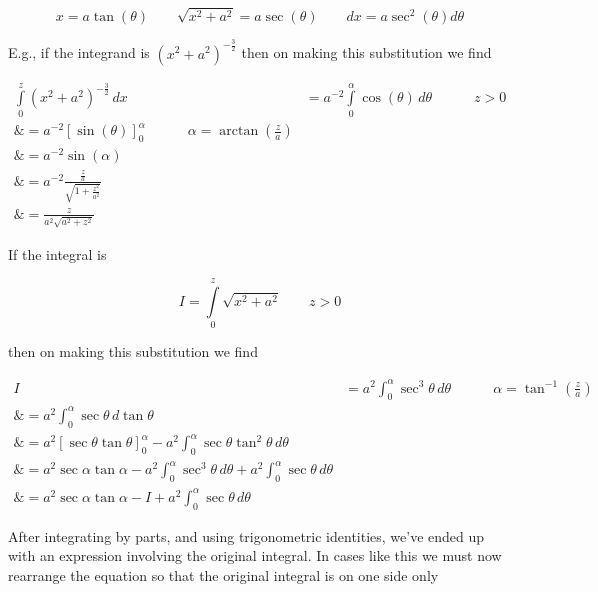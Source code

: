$$x=a\tan(\theta)\qquad\sqrt{x^2+a^2}=a\sec(\theta)\qquad dx=a\sec^2(\theta)d\theta$$



E.g., if the integrand is $(x^2+a^2)^{-\frac32}$ then on making this substitution we find



\begin{align}
\int\limits _0^z(x^2+a^2)^{-\frac{3}{2}}\,dx 

&= a^{-2}\int\limits _0^\alpha \cos(\theta)\,d\theta \quad\quad\quad z>0 \\\&= a^{-2}\left[\sin(\theta)\right] _0^\alpha \quad\quad\quad \alpha = \arctan\left(\tfrac{z}{a}\right) \\\&= a^{-2}\sin(\alpha) \\\&= a^{-2}\frac{\frac{z}{a}}{\sqrt{1+\frac{z^2}{a^2}}} \\\&= \frac{z}{a^2\sqrt{a^2+z^2}}
\end{align}







If the integral is



$$I=\int\limits _0^z\sqrt{x^2+a^2}\qquad z>0$$



then on making this substitution we find



\begin{align}
I &= a^2 \int _0^\alpha \sec^3 \theta \, d\theta \quad\quad\quad \alpha = \tan^{-1} \left(\tfrac{z}{a}\right) \\\&= a^2 \int _0^\alpha \sec \theta \, d\tan \theta \\\&= a^2 \left[ \sec \theta \tan \theta \right] _0^\alpha - a^2 \int _0^\alpha \sec \theta \tan^2 \theta \, d\theta \\\&= a^2 \sec \alpha \tan \alpha - a^2 \int _0^\alpha \sec^3 \theta \, d\theta  + a^2 \int _0^\alpha \sec \theta \, d\theta \\\&= a^2 \sec \alpha \tan \alpha - I + a^2 \int _0^\alpha \sec \theta \, d\theta
\end{align}





After integrating by parts, and using trigonometric identities, we've ended up with an expression involving the original integral. In cases like this we must now rearrange the equation so that the original integral is on one side only



